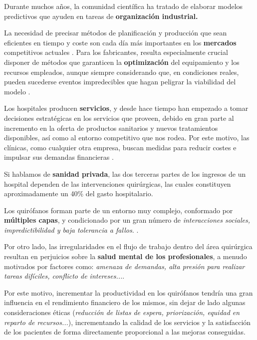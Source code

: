 
Durante muchos años, la comunidad científica ha tratado de elaborar modelos predictivos que ayuden en tareas de \textbf{organización industrial.}

La necesidad de precisar métodos de planificación y producción que sean eficientes en tiempo y coste son cada día más importantes en los \textbf{mercados} competitivos actuales \cite{Geurtsen2023ProductionReview}. Para los fabricantes, resulta especialmente crucial disponer de métodos que garanticen la \textbf{optimización} del equipamiento y los recursos empleados, aunque siempre considerando que, en condiciones reales, pueden sucederse eventos impredecibles que hagan peligrar la viabilidad del modelo \cite{Geurtsen2023ProductionReview}.

Los hospitales producen \textbf{servicios}, y desde hace tiempo han empezado a tomar decisiones estratégicas en los servicios que proveen, debido en gran parte al incremento en la oferta de productos sanitarios y nuevos tratamientos disponibles, así como al entorno competitivo que nos rodea.
Por este motivo, las clínicas, como cualquier otra empresa, buscan medidas para reducir costes e impulsar sus demandas financieras \cite{Maleki2023AMoment}.

Si hablamos de \textbf{sanidad privada}, las dos terceras partes de los ingresos de un hospital dependen de las intervenciones quirúrgicas, las cuales constituyen aproximadamente un 40\% del gasto hospitalario\cite{Pham2008SurgicalProblem}.

Los quirófanos forman parte de un entorno muy complejo, conformado por \textbf{múltiples capas}, y condicionado por un gran número de \textit{interacciones sociales, impredictibilidad y baja tolerancia a fallos.} \cite{Rothstein2018OperatingEfficiency}. 

Por otro lado, las irregularidades en el flujo de trabajo dentro del área quirúrgica resultan en perjuicios sobre la \textbf{salud mental de los profesionales}, a menudo motivados por factores como: \textit{amenaza de demandas, alta presión para realizar tareas difíciles, conflicto de intereses...}\cite{Wheelock2015TheTeamwork}.

Por este motivo, incrementar la productividad en los quirófanos tendría una gran influencia en el rendimiento financiero de los mismos, sin dejar de lado algunas consideraciones éticas (\textit{reducción de listas de espera, priorización, equidad en reparto de recursos...}), incrementando la calidad de los servicios y la satisfacción de los pacientes de forma directamente proporcional a las mejoras conseguidas.

